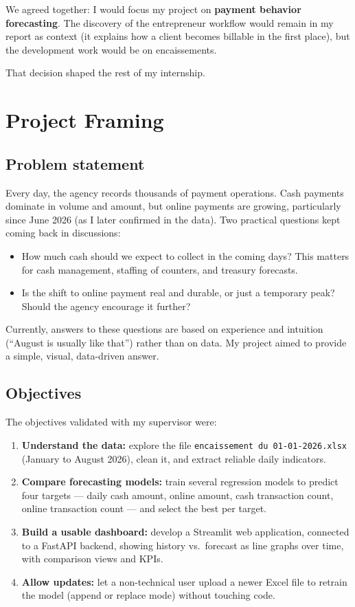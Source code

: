 \documentclass[12pt,a4paper]{report}
\begin{document}
We agreed together: I would focus my project on \textbf{payment behavior forecasting}. The discovery of the entrepreneur workflow would remain in my report as context (it explains how a client becomes billable in the first place), but the development work would be on encaissements.

That decision shaped the rest of my internship.

\chapter{Project Framing}

\section{Problem statement}

Every day, the agency records thousands of payment operations. Cash payments dominate in volume and amount, but online payments are growing, particularly since June 2026 (as I later confirmed in the data). Two practical questions kept coming back in discussions:

\begin{itemize}
\item How much cash should we expect to collect in the coming days? This matters for cash management, staffing of counters, and treasury forecasts.
\item Is the shift to online payment real and durable, or just a temporary peak? Should the agency encourage it further?
\end{itemize}

Currently, answers to these questions are based on experience and intuition (``August is usually like that'') rather than on data. My project aimed to provide a simple, visual, data-driven answer.

\section{Objectives}

The objectives validated with my supervisor were:

\begin{enumerate}
\item \textbf{Understand the data:} explore the file \texttt{encaissement du 01-01-2026.xlsx} (January to August 2026), clean it, and extract reliable daily indicators.
\item \textbf{Compare forecasting models:} train several regression models to predict four targets --- daily cash amount, online amount, cash transaction count, online transaction count --- and select the best per target.
\item \textbf{Build a usable dashboard:} develop a Streamlit web application, connected to a FastAPI backend, showing history vs.\ forecast as line graphs over time, with comparison views and KPIs.
\item \textbf{Allow updates:} let a non-technical user upload a newer Excel file to retrain the model (append or replace mode) without touching code.
\end{enumerate}
\end{document}
